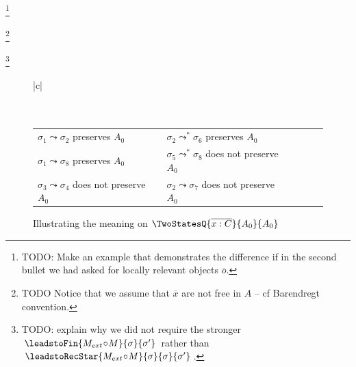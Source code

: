   
  \footnote{{TODO: Make an example that demonstrates the difference if in the second bullet we had asked for locally relevant objects ${\overline o}$.}}
 
\footnote{{TODO Notice that we assume that $\overline x$ are not free in $A$ -- cf Barendregt convention.}}

\footnote{TODO: explain why we did not require the stronger $\leadstoFin{M_{ext}\!\circ \!M}{\sigma}{\sigma'}$ rather than $\leadstoRecStar {M_{ext}\!\circ \!M}{\sigma}{\sigma} {\sigma'}$.}



 
 \begin{figure}[htb]
\begin{tabular}{|c|}
\hline \\
\\
\hline
\\
\begin{tabular}{lclclcl} 
$ {\sigma_1} \leadsto  \sigma_2 $ preserves $A_0$ & &
$ {\sigma_2} \leadsto^*  \sigma_6 $ preserves $A_0$ \\
$ {\sigma_1} \leadsto  \sigma_8 $ preserves $A_0$ & &
$ {\sigma_5} \leadsto^* \sigma_8 $ does not preserve $A_0$\\
$ {\sigma_3} \leadsto  \sigma_4 $ does not preserve $A_0$ & &
$ {\sigma_2} \leadsto  \sigma_7 $ does not preserve $A_0$
\\
\hline
\end{tabular}
\end{tabular}
   \caption{Illustrating  the meaning on ${\TwoStatesQ {\overline {x:C}} {A_0}{A_0}}$    }
   \label{fig:TwoStateSemantics}
 \end{figure}
 

